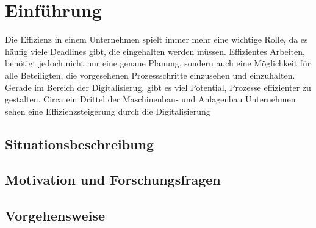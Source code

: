 \section{Einführung}

Die Effizienz in einem Unternehmen spielt immer mehr eine wichtige Rolle, da es häufig viele Deadlines gibt, die eingehalten werden müssen. Effizientes
Arbeiten, benötigt jedoch nicht nur eine genaue Planung, sondern auch eine Möglichkeit für alle Beteiligten,
die vorgesehenen Prozessschritte einzusehen und einzuhalten. Gerade im Bereich der Digitalisierug, gibt es viel Potential, Prozesse 
effizienter zu gestalten. Circa ein Drittel der Maschinenbau- und Anlagenbau Unternehmen sehen eine Effizienzsteigerung durch die 
Digitalisierung \cite{stat17}

\subsection{Situationsbeschreibung}


\subsection{Motivation und Forschungsfragen}


\subsection{Vorgehensweise}
